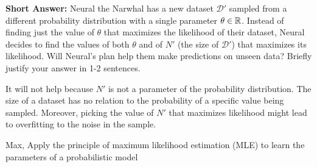 \begin{parts}
\begin{subparts}
\subpart[2] \textbf{Short Answer:} Neural the Narwhal has a new dataset $\mathcal{D}'$ sampled from a different probability distribution with a single parameter $\theta \in \mathbb{R}$. Instead of finding just the value of $\theta$ that maximizes the likelihood of their dataset, Neural decides to find the values of both $\theta$ and of $N'$ (the size of $\mathcal{D}'$) that maximizes its likelihood. Will Neural's plan help them make predictions on unseen data? Briefly justify your answer in 1-2 sentences.
    \fillwithlines{7em}
    \begin{soln} 
        It will not help because $N'$ is not a parameter of the probability distribution. The size of a dataset has no relation to the probability of a specific value being sampled. Moreover, picking the value of $N'$ that maximizes likelihood might lead to overfitting to the noise in the sample.
    \end{soln}
    \begin{qauthor}
        Max, Apply the principle of maximum likelihood estimation (MLE) to learn the parameters
    of a probabilistic model
    \end{qauthor}
    \end{subparts}

\end{parts}